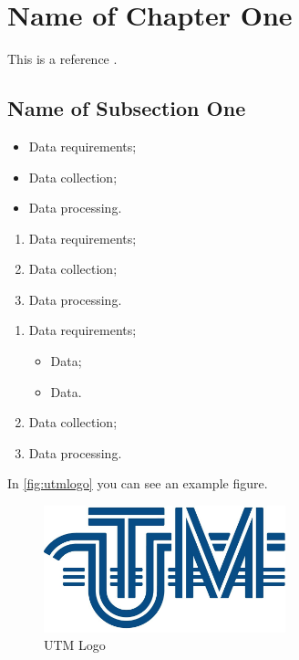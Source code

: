 \section{Name of Chapter One}

\lipsum[5]
This is a reference \cite{ref:zoo}.

\subsection{Name of Subsection One}

\lipsum[6]

\begin{itemize}
	\item Data requirements;
	\item Data collection;
	\item Data processing.
\end{itemize}

\lipsum[6]

\begin{enumerate}
	\item Data requirements;
	\item Data collection;
	\item Data processing.
\end{enumerate}

\lipsum[6]

\begin{enumerate}
	\item Data requirements;
	\begin{itemize}
    	\item Data;
    	\item Data.
    \end{itemize}
	\item Data collection;
	\item Data processing.
\end{enumerate}

\lipsum[5]
In \autoref{fig:utmlogo} you can see an example figure.

\begin{figure}[H]
    \centering
    \includegraphics[width=7cm]{"images/Logo"}
    \caption{UTM Logo \cite{ref:zoo2}}
    \label{fig:utmlogo}
\end{figure}

